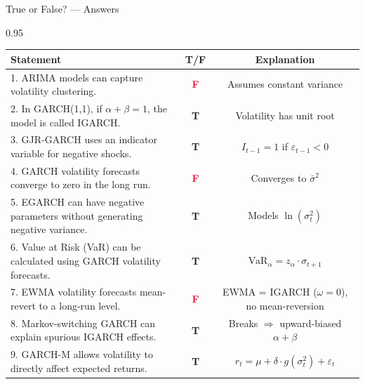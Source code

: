 \documentclass[9pt, aspectratio=169, t]{beamer}
\begin{document}
\begin{frame}{True or False? --- Answers}
    \begin{cminipage}{0.95\textwidth}
    \scriptsize
    \begin{center}
    \begin{tabular}{p{7.5cm}cc}
        \toprule
        \textbf{Statement} & \textbf{T/F} & \textbf{Explanation} \\
        \midrule
        1. ARIMA models can capture volatility clustering. & \textcolor{Crimson}{\textbf{F}} & {\tiny Assumes constant variance} \\[0.08cm]
        2. In GARCH(1,1), if $\alpha + \beta = 1$, the model is called IGARCH. & \textcolor{Forest}{\textbf{T}} & {\tiny Volatility has unit root} \\[0.08cm]
        3. GJR-GARCH uses an indicator variable for negative shocks. & \textcolor{Forest}{\textbf{T}} & {\tiny $I_{t-1} = 1$ if $\varepsilon_{t-1} < 0$} \\[0.08cm]
        4. GARCH volatility forecasts converge to zero in the long run. & \textcolor{Crimson}{\textbf{F}} & {\tiny Converges to $\bar{\sigma}^2$} \\[0.08cm]
        5. EGARCH can have negative parameters without generating negative variance. & \textcolor{Forest}{\textbf{T}} & {\tiny Models $\ln(\sigma_t^2)$} \\[0.08cm]
        6. Value at Risk (VaR) can be calculated using GARCH volatility forecasts. & \textcolor{Forest}{\textbf{T}} & {\tiny $\text{VaR}_\alpha = z_\alpha \cdot \sigma_{t+1}$} \\[0.08cm]
        7. EWMA volatility forecasts mean-revert to a long-run level. & \textcolor{Crimson}{\textbf{F}} & {\tiny EWMA = IGARCH ($\omega=0$), no mean-reversion} \\[0.08cm]
        8. Markov-switching GARCH can explain spurious IGARCH effects. & \textcolor{Forest}{\textbf{T}} & {\tiny Breaks $\Rightarrow$ upward-biased $\alpha+\beta$} \\[0.08cm]
        9. GARCH-M allows volatility to directly affect expected returns. & \textcolor{Forest}{\textbf{T}} & {\tiny $r_t = \mu + \delta \cdot g(\sigma_t^2) + \varepsilon_t$} \\
        \bottomrule
    \end{tabular}
    \end{center}
    \end{cminipage}
\end{frame}

\end{document}
